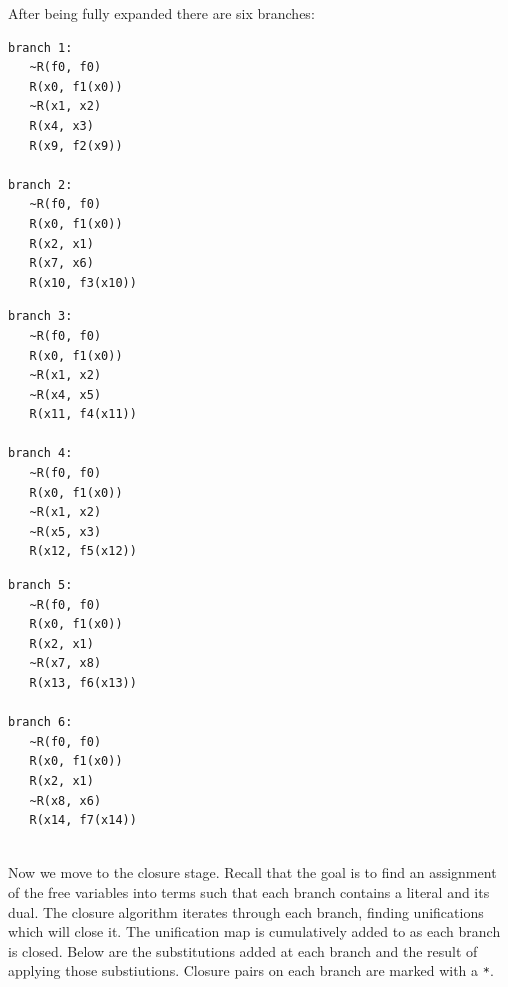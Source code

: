 \documentclass[a4paper,notitlepage]{scrartcl}
\begin{document}
After being fully expanded there are six branches:

\begin{minipage}[t]{.3\textwidth}
\begin{verbatim}
branch 1:
   ~R(f0, f0)
   R(x0, f1(x0))
   ~R(x1, x2)
   R(x4, x3)
   R(x9, f2(x9))
   
branch 2:
   ~R(f0, f0)
   R(x0, f1(x0))
   R(x2, x1)
   R(x7, x6)
   R(x10, f3(x10))
\end{verbatim}
\end{minipage}
\begin{minipage}[t]{.3\textwidth}
\begin{verbatim}
branch 3:
   ~R(f0, f0)
   R(x0, f1(x0))
   ~R(x1, x2)
   ~R(x4, x5)
   R(x11, f4(x11))

branch 4:
   ~R(f0, f0)
   R(x0, f1(x0))
   ~R(x1, x2)
   ~R(x5, x3)
   R(x12, f5(x12))
\end{verbatim}
\end{minipage}
\begin{minipage}[t]{.3\textwidth}
\begin{verbatim}
branch 5:
   ~R(f0, f0)
   R(x0, f1(x0))
   R(x2, x1)
   ~R(x7, x8)
   R(x13, f6(x13))

branch 6:
   ~R(f0, f0)
   R(x0, f1(x0))
   R(x2, x1)
   ~R(x8, x6)
   R(x14, f7(x14))
\end{verbatim}

\end{minipage}
\hfill\  \\

Now we move to the closure stage.
Recall that the goal is to find an assignment of the free variables 
   into terms such that each branch contains a literal and its dual.
The closure algorithm iterates through each branch, finding unifications
   which will close it.
The unification map is cumulatively added to as each branch is closed.
Below are the substitutions added at each branch and the result of
   applying those substiutions.
Closure pairs on each branch are marked with a \texttt{*}.
\end{document}
